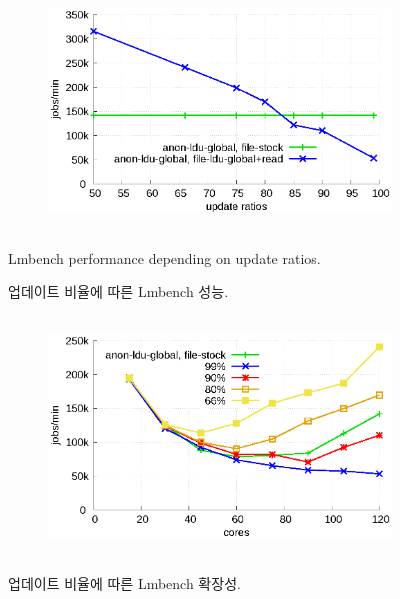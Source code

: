 \begin{figure}[t!]
    \centering
    \begin{subfigure}[b]{1\textwidth}
  \begin{center}
        \includegraphics[height=2.5in]{graph/ratio_lmbench.eps}
  \end{center}
    \end{subfigure}%
    \caption{Lmbench performance depending on update ratios.}
    \caption{업데이트 비율에 따른 Lmbench 성능.}
    \label{fig:UpdateRate_lmbench}
\end{figure}

\begin{figure}[t!]
    \centering
    \begin{subfigure}[b]{1\textwidth}
        \includegraphics[height=2.5in]{graph/ratio_lmbench_core.eps}
    \end{subfigure}%
    \caption{업데이트 비율에 따른 Lmbench 확장성.}
    \label{fig:UpdateRate_lmbench_2}
\end{figure}


